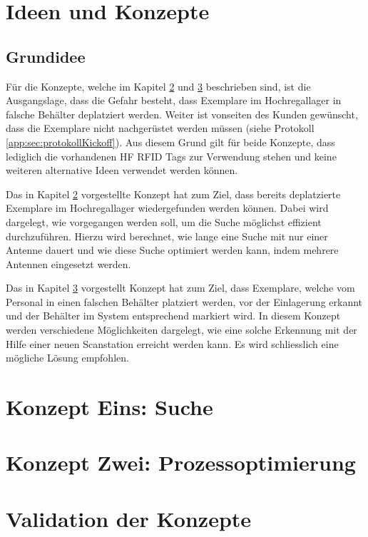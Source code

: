 \chapter{Ideen und Konzepte}

\section{Grundidee}
Für die Konzepte, welche im Kapitel \ref{ch:konzeptEins} und \ref{ch:konzeptZwei} beschrieben sind, ist die Ausgangslage, dass die Gefahr besteht, dass Exemplare im Hochregallager in falsche Behälter deplatziert werden. Weiter ist vonseiten des Kunden gewünscht, dass die Exemplare nicht nachgerüstet werden müssen (siehe Protokoll \ref{app:sec:protokollKickoff}). Aus diesem Grund gilt für beide Konzepte, dass lediglich die vorhandenen HF RFID Tags zur Verwendung stehen und keine weiteren alternative Ideen verwendet werden können.

Das in Kapitel \ref{ch:konzeptEins} vorgestellte Konzept hat zum Ziel, dass bereits deplatzierte Exemplare im Hochregallager wiedergefunden werden können. Dabei wird dargelegt, wie vorgegangen werden soll, um die Suche möglichst effizient durchzuführen. Hierzu wird berechnet, wie lange eine Suche mit nur einer Antenne dauert und wie diese Suche optimiert werden kann, indem mehrere Antennen eingesetzt werden.

Das in Kapitel \ref{ch:konzeptZwei} vorgestellt Konzept hat zum Ziel, dass Exemplare, welche vom Personal in einen falschen Behälter platziert werden, vor der Einlagerung erkannt und der Behälter im System entsprechend markiert wird. In diesem Konzept werden verschiedene Möglichkeiten dargelegt, wie eine solche Erkennung mit der Hilfe einer neuen Scanstation erreicht werden kann. Es wird schliesslich eine mögliche Lösung empfohlen.

\chapter{Konzept Eins: Suche}
\label{ch:konzeptEins}


\chapter{Konzept Zwei: Prozessoptimierung}
\label{ch:konzeptZwei}



\chapter{Validation der Konzepte}

